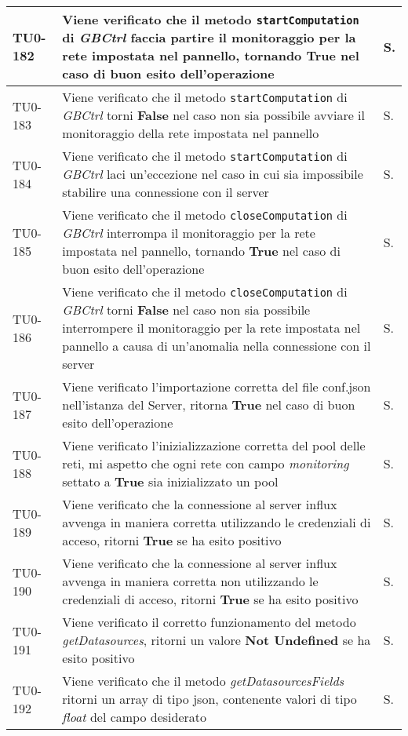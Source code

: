 \begin{longtable}{|C{.15\textwidth}|m{.66\textwidth}|C{.10\textwidth}|}
\hline
TU0-182 & Viene verificato che il metodo \texttt{startComputation} di \textit{GBCtrl} faccia partire il monitoraggio per la rete impostata nel pannello, tornando \textbf{True} nel caso di buon esito dell'operazione & S.\\
\hline
{}TU0-183 & Viene verificato che il metodo \texttt{startComputation} di \textit{GBCtrl} torni \textbf{False} nel caso non sia possibile avviare il monitoraggio della rete impostata nel pannello & S.\\
\hline
TU0-184 & Viene verificato che il metodo \texttt{startComputation} di \textit{GBCtrl} laci un'eccezione nel caso in cui sia impossibile stabilire una connessione con il server & S.\\
\hline
{}TU0-185 & Viene verificato che il metodo \texttt{closeComputation} di \textit{GBCtrl} interrompa il monitoraggio per la rete impostata nel pannello, tornando \textbf{True} nel caso di buon esito dell'operazione & S.\\
\hline
TU0-186 & Viene verificato che il metodo \texttt{closeComputation} di \textit{GBCtrl} torni \textbf{False} nel caso non sia possibile interrompere il monitoraggio per la rete impostata nel pannello a causa di un'anomalia nella connessione con il server & S.\\
\hline
{}TU0-187 & Viene verificato l'importazione corretta del file conf.json nell'istanza del Server, ritorna \textbf{True} nel caso di buon esito dell'operazione & S.\\
\hline
TU0-188 & Viene verificato l'inizializzazione corretta del pool delle reti, mi aspetto che ogni rete con campo \textit{monitoring} settato a \textbf{True} sia inizializzato un pool & S.\\
\hline
{}TU0-189 & Viene verificato che la connessione al server influx avvenga in maniera corretta utilizzando le credenziali di acceso, ritorni \textbf{True} se ha esito positivo & S.\\
\hline
TU0-190 & Viene verificato che la connessione al server influx avvenga in maniera corretta non utilizzando le credenziali di acceso, ritorni \textbf{True} se ha esito positivo & S.\\
\hline
{}TU0-191 & Viene verificato il corretto funzionamento del metodo \textit{getDatasources}, ritorni un valore \textbf{Not Undefined} se ha esito positivo & S.\\
\hline
TU0-192 & Viene verificato che il metodo \textit{getDatasourcesFields} ritorni un array di tipo json, contenente valori di tipo \textit{float} del campo desiderato & S.\\

\end{longtable}
